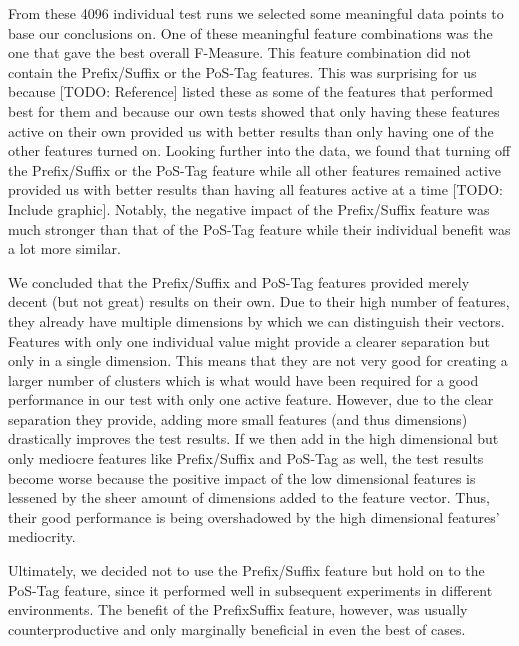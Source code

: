 From these 4096 individual test runs we selected some meaningful data points to base our conclusions on.
One of these meaningful feature combinations was the one that gave the best overall F-Measure.
This feature combination did not contain the Prefix/Suffix or the PoS-Tag features.
This was surprising for us because [TODO: Reference] listed these as some of the features that performed best for them and because our own tests showed that only having these features active on their own provided us with better results than only having one of the other features turned on.
Looking further into the data, we found that turning off the Prefix/Suffix or the PoS-Tag feature while all other features remained active provided us with better results than having all features active at a time [TODO: Include graphic].
Notably, the negative impact of the Prefix/Suffix feature was much stronger than that of the PoS-Tag feature while their individual benefit was a lot more similar.


We concluded that the Prefix/Suffix and PoS-Tag features provided merely decent (but not great) results on their own.
Due to their high number of features, they already have multiple dimensions by which we can distinguish their vectors.
Features with only one individual value might provide a clearer separation but only in a single dimension.
This means that they are not very good for creating a larger number of clusters which is what would have been required for a good performance in our test with only one active feature.
However, due to the clear separation they provide, adding more small features (and thus dimensions) drastically improves the test results.
If we then add in the high dimensional but only mediocre features like Prefix/Suffix and PoS-Tag as well, the test results become worse because the positive impact of the low dimensional features is lessened by the sheer amount of dimensions added to the feature vector.
Thus, their good performance is being overshadowed by the high dimensional features' mediocrity.


Ultimately, we decided not to use the Prefix/Suffix feature but hold on to the PoS-Tag feature, since it performed well in subsequent experiments in different environments.
The benefit of the PrefixSuffix feature, however, was usually counterproductive and only marginally beneficial in even the best of cases.